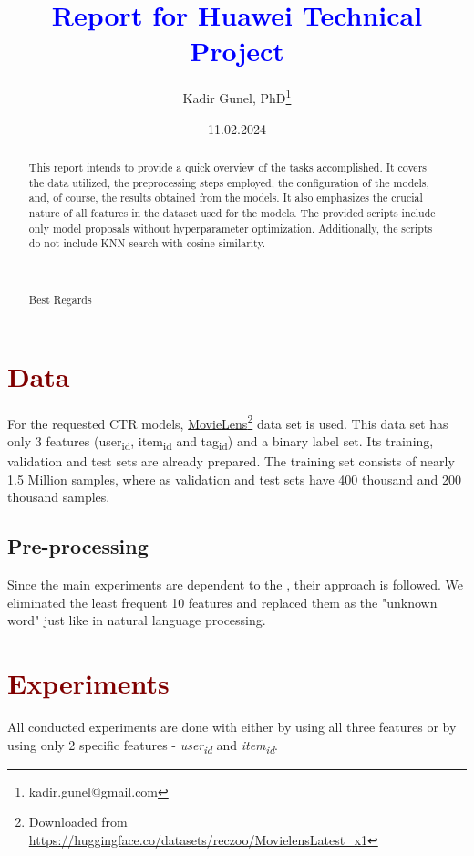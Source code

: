 \documentclass[nobib]{tufte-handout}
\author{Kadir Gunel, PhD\thanks{kadir.gunel@gmail.com}}
\date{11.02.2024}
\title{\textcolor{Blue}{Report for Huawei Technical Project}}
\begin{document}
\maketitle
\begin{abstract}
This report intends to provide a quick overview of the tasks accomplished. It covers the data utilized, the preprocessing steps employed, the configuration of the models, and, of course, the results obtained from the models. It also emphasizes the crucial nature of all features in the dataset used for the models. The provided scripts include only model proposals without hyperparameter optimization. Additionally, the scripts do not include KNN search with cosine similarity.

\\
\\
Best Regards 
\end{abstract}


\section{\textcolor{Maroon}{Data}}
\label{sec:org141caea}

For the requested CTR models, \href{https://huggingface.co/datasets/reczoo/MovielensLatest\_x1}{MovieLens}\footnote{Downloaded from \url{https://huggingface.co/datasets/reczoo/MovielensLatest\_x1}} data set is
used. This data set has only 3 features (user\textsubscript{id}, item\textsubscript{id} and
tag\textsubscript{id}) and a binary label set. Its training, validation and test
sets are already prepared. The training set consists of nearly 1.5
Million samples, where as validation and test sets have 400 thousand
and 200 thousand samples. 


\subsection{\textcolor{Mahogany}{Pre-processing}}
\label{sec:orge28ebdf}

Since the main experiments are dependent to the \cite{zhao2022fint},
their approach is followed. We eliminated the least frequent 10
features and replaced them as the "unknown word" just like in natural
language processing. 


\section{\textcolor{Maroon}{Experiments}}
\label{sec:orgd7d8b4d}
All conducted experiments are done with either by using all three 
features or  by using only 2 specific features - \emph{user\textsubscript{id}} and
\emph{item\textsubscript{id}}. 
\end{document}
